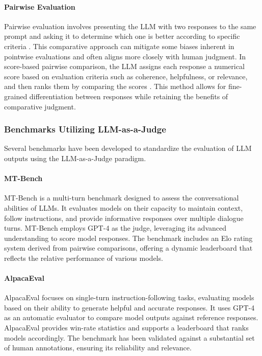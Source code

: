 \documentclass[sigconf, authoryear]{acmart}
\begin{document}
\paragraph{Pairwise Evaluation}


Pairwise evaluation involves presenting the LLM with two responses to the same prompt and asking it to determine which one is better according to specific criteria \cite{liusie2024llmcomparativeassessmentzeroshot}.
This comparative approach can mitigate some biases inherent in pointwise evaluations and often aligns more closely with human judgment.
In score-based pairwise comparison, the LLM assigns each response a numerical score based on evaluation criteria such as coherence, helpfulness, or relevance, and then ranks them by comparing the scores \cite{liu2024aligning}.
This method allows for fine-grained differentiation between responses while retaining the benefits of comparative judgment.

\subsubsection{Benchmarks Utilizing LLM-as-a-Judge}


Several benchmarks have been developed to standardize the evaluation of LLM outputs using the LLM-as-a-Judge paradigm.


\paragraph{MT-Bench}


MT-Bench is a multi-turn benchmark designed to assess the conversational abilities of LLMs.
It evaluates models on their capacity to maintain context, follow instructions, and provide informative responses over multiple dialogue turns.
MT-Bench employs GPT-4 as the judge, leveraging its advanced understanding to score model responses.
The benchmark includes an Elo rating system derived from pairwise comparisons, offering a dynamic leaderboard that reflects the relative performance of various models\cite{mtbench}.


\paragraph{AlpacaEval}


AlpacaEval focuses on single-turn instruction-following tasks, evaluating models based on their ability to generate helpful and accurate responses.
It uses GPT-4 as an automatic evaluator to compare model outputs against reference responses.
AlpacaEval provides win-rate statistics and supports a leaderboard that ranks models accordingly.
The benchmark has been validated against a substantial set of human annotations, ensuring its reliability and relevance\cite{alpaca_eval}.
\end{document}
